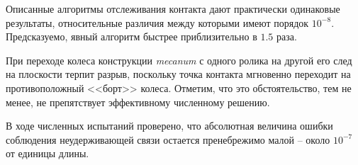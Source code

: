 Описанные алгоритмы отслеживания контакта дают практически одинаковые результаты, относительные различия между которыми имеют порядок $10^{-8}$. Предсказуемо, явный алгоритм быстрее приблизительно в $1.5$ раза.

При переходе колеса конструкции \textit{mecanum} с одного ролика на другой его след на плоскости терпит разрыв, поскольку точка контакта мгновенно переходит на противоположный <<борт>> колеса. Отметим, что это обстоятельство, тем не менее, не препятствует эффективному численному решению.

%

В ходе численных испытаний проверено, что абсолютная величина ошибки соблюдения неудерживающей связи 
остается пренебрежимо малой -- около $10^{-7}$ от единицы длины.

